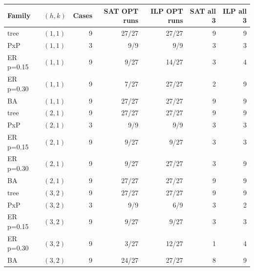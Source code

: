 \begin{tabular}{llrrrrr}
\toprule
Family & $(h,k)$ & Cases & SAT OPT runs & ILP OPT runs & SAT all 3 & ILP all 3\\
\midrule
tree & $(1,1)$ & 9 & 27/27 & 27/27 & 9 & 9\\
PxP & $(1,1)$ & 3 & 9/9 & 9/9 & 3 & 3\\
ER p=0.15 & $(1,1)$ & 9 & 9/27 & 14/27 & 3 & 4\\
ER p=0.30 & $(1,1)$ & 9 & 7/27 & 27/27 & 2 & 9\\
BA & $(1,1)$ & 9 & 27/27 & 27/27 & 9 & 9\\
tree & $(2,1)$ & 9 & 27/27 & 27/27 & 9 & 9\\
PxP & $(2,1)$ & 3 & 9/9 & 9/9 & 3 & 3\\
ER p=0.15 & $(2,1)$ & 9 & 9/27 & 9/27 & 3 & 3\\
ER p=0.30 & $(2,1)$ & 9 & 9/27 & 27/27 & 3 & 9\\
BA & $(2,1)$ & 9 & 27/27 & 27/27 & 9 & 9\\
tree & $(3,2)$ & 9 & 27/27 & 27/27 & 9 & 9\\
PxP & $(3,2)$ & 3 & 9/9 & 6/9 & 3 & 2\\
ER p=0.15 & $(3,2)$ & 9 & 9/27 & 9/27 & 3 & 3\\
ER p=0.30 & $(3,2)$ & 9 & 3/27 & 12/27 & 1 & 4\\
BA & $(3,2)$ & 9 & 24/27 & 27/27 & 8 & 9\\
\bottomrule
\end{tabular}
